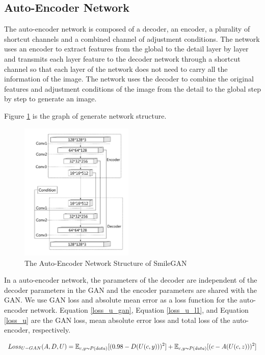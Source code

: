 \subsection{Auto-Encoder Network}
The auto-encoder network is composed of a decoder, an encoder, a plurality of shortcut channels and a combined channel of adjustment conditions.
The network uses an encoder to extract features from the global to the detail layer by layer and transmits each layer feature to the decoder network through a shortcut channel so that each layer of the network does not need to carry all the information of the image.
The network uses the decoder to combine the original features and adjustment conditions of the image from the detail to the global step by step to generate an image.

Figure \ref{net_auto-encoder} is the graph of generate network structure.

\begin{figure}
    \begin{center}
    \includegraphics[width=0.48\textwidth]{figures/net_auto-encoder.pdf}
    \caption{The Auto-Encoder Network Structure of SmileGAN}
    \label{net_auto-encoder}
    \end{center}
\end{figure}

In a auto-encoder network, the parameters of the decoder are independent of the decoder parameters in the GAN and the encoder parameters are shared with the GAN.
We use GAN loss and absolute mean error as a loss function for the auto-encoder network.
Equation \eqref{loss_u_gan}, Equation \eqref{loss_u_l1}, and Equation \eqref{loss_u} are the GAN loss, mean absolute error loss and total loss of the auto-encoder, respectively.

\begin{equation}
    Loss_{U-GAN}(A,D,U)=
    \mathbb{E}_{c,y\thicksim P(data)}[(0.98-D(U(c,y)))^2]+
    \mathbb{E}_{c,y\thicksim P(data)}[(c-A(U(c,z)))^2]
    \label{loss_u_gan}
\end{equation}

